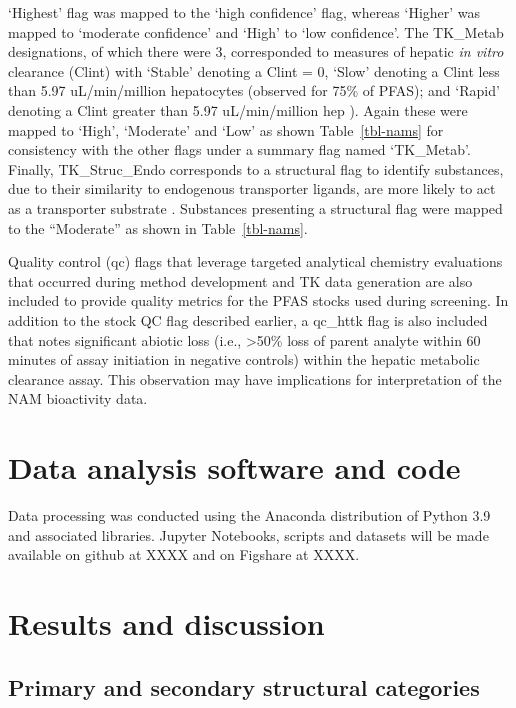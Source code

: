 \documentclass[
  super,
  preprint,
  3p]{elsarticle}
\begin{document}
`Highest' flag was mapped to the `high confidence' flag, whereas
`Higher' was mapped to `moderate confidence' and `High' to `low
confidence'. The TK\_Metab designations, of which there were 3,
corresponded to measures of hepatic \emph{in vitro} clearance (Clint)
with `Stable' denoting a Clint = 0, `Slow' denoting a Clint less than
5.97 uL/min/million hepatocytes (observed for 75\% of PFAS); and `Rapid'
denoting a Clint greater than 5.97 uL/min/million hep
\citep{kreutz_category-based_2023, crizer2023vitro}). Again these were
mapped to `High', `Moderate' and `Low' as shown Table~\ref{tbl-nams} for
consistency with the other flags under a summary flag named `TK\_Metab'.
Finally, TK\_Struc\_Endo corresponds to a structural flag to identify
substances, due to their similarity to endogenous transporter ligands,
are more likely to act as a transporter substrate
\citep{dawson_machine_2023}. Substances presenting a structural flag
were mapped to the ``Moderate'' as shown in Table~\ref{tbl-nams}.

Quality control (qc) flags that leverage targeted analytical chemistry
evaluations that occurred during method development and TK data
generation are also included to provide quality metrics for the PFAS
stocks used during screening. In addition to the stock QC flag described
earlier, a qc\_httk flag is also included that notes significant abiotic
loss (i.e., \textgreater50\% loss of parent analyte within 60 minutes of
assay initiation in negative controls) within the hepatic metabolic
clearance assay. This observation may have implications for
interpretation of the NAM bioactivity data.

\hypertarget{sec-code}{%
\section{Data analysis software and code}\label{sec-code}}

Data processing was conducted using the Anaconda distribution of Python
3.9 and associated libraries. Jupyter Notebooks, scripts and datasets
will be made available on github at XXXX and on Figshare at XXXX.

\hypertarget{results-and-discussion}{%
\section{Results and discussion}\label{results-and-discussion}}

\hypertarget{primary-and-secondary-structural-categories}{%
\subsection{Primary and secondary structural
categories}\label{primary-and-secondary-structural-categories}}
\end{document}
